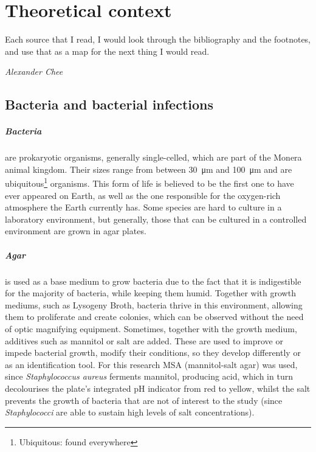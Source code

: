 \chapter{Theoretical context}
\epigraph{Each source that I read, I would look through the bibliography and the footnotes, and use that as a map for the next thing I would read.}{\textit{Alexander Chee}}
\section{Bacteria and bacterial infections}
\paragraph{Bacteria} are prokaryotic organisms, generally single-celled, which are part of the Monera animal kingdom. Their sizes range from between \SI{30}{\micro\metre} and \SI{100}{\micro\metre} and are ubiquitous\footnote{Ubiquitous: found everywhere} organisms. This form of life is believed to be the first one to have ever appeared on Earth, as well as the one responsible for the oxygen-rich atmosphere the Earth currently has. Some species are hard to culture in a laboratory environment, but generally, those that can be cultured in a controlled environment are grown in agar plates\cite{murrayMicrobiologiaMedica2013}. \newline
\paragraph{Agar} is used as a base medium to grow bacteria due to the fact that it is indigestible for the majority of bacteria, while keeping them humid. Together with growth mediums, such as Lysogeny Broth, bacteria thrive in this environment, allowing them to proliferate and create colonies, which can be observed without the need of optic magnifying equipment. Sometimes, together with the growth medium, additives such as mannitol or salt are added. These are used to improve or impede bacterial growth, modify their conditions, so they develop differently or as an identification tool. For this research MSA (mannitol-salt agar) was used, since \emph{Staphylococcus aureus} ferments mannitol, producing acid, which in turn decolourises the plate's integrated pH indicator from red to yellow, whilst the salt prevents the growth of bacteria that are not of interest to the study (since \emph{Staphylococci} are able to sustain high levels of salt concentrations)\cite{gamazoManualPracticoMicrobiologia2010}.
